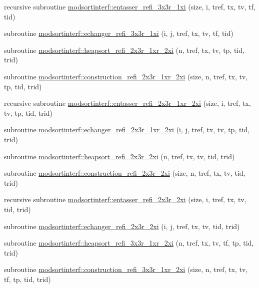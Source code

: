 \begin{DoxyCompactItemize}
\item 
recursive subroutine \hyperlink{namespacemodsortinterf_aab48af578f5c010d365e32ceb20016e0}{modsortinterf\+::entasser\+\_\+refi\+\_\+3x3r\+\_\+1xi} (size, i, tref, tx, tv, tf, tid)
\item 
subroutine \hyperlink{namespacemodsortinterf_a1a9f478c81adb385c800d2db67b4db17}{modsortinterf\+::echanger\+\_\+refi\+\_\+3x3r\+\_\+1xi} (i, j, tref, tx, tv, tf, tid)
\item 
subroutine \hyperlink{namespacemodsortinterf_a662bed8ed392d0d204cc36d1e48fce5b}{modsortinterf\+::heapsort\+\_\+refi\+\_\+2x3r\+\_\+1xr\+\_\+2xi} (n, tref, tx, tv, tp, tid, trid)
\item 
subroutine \hyperlink{namespacemodsortinterf_a0f142d1542ca18e784179367feaa2da8}{modsortinterf\+::construction\+\_\+refi\+\_\+2x3r\+\_\+1xr\+\_\+2xi} (size, n, tref, tx, tv, tp, tid, trid)
\item 
recursive subroutine \hyperlink{namespacemodsortinterf_add447bee1dc15569b2978988dd7f49f8}{modsortinterf\+::entasser\+\_\+refi\+\_\+2x3r\+\_\+1xr\+\_\+2xi} (size, i, tref, tx, tv, tp, tid, trid)
\item 
subroutine \hyperlink{namespacemodsortinterf_a8d80b3f18a439642b1f44e9cc0b624dd}{modsortinterf\+::echanger\+\_\+refi\+\_\+2x3r\+\_\+1xr\+\_\+2xi} (i, j, tref, tx, tv, tp, tid, trid)
\item 
subroutine \hyperlink{namespacemodsortinterf_af0070ac4a4a32d7b75892c431a266ce5}{modsortinterf\+::heapsort\+\_\+refi\+\_\+2x3r\+\_\+2xi} (n, tref, tx, tv, tid, trid)
\item 
subroutine \hyperlink{namespacemodsortinterf_a36e0afef1ddbaec6e02812e1e6cf412f}{modsortinterf\+::construction\+\_\+refi\+\_\+2x3r\+\_\+2xi} (size, n, tref, tx, tv, tid, trid)
\item 
recursive subroutine \hyperlink{namespacemodsortinterf_a4c07f7c23233d32c941f288e1863160e}{modsortinterf\+::entasser\+\_\+refi\+\_\+2x3r\+\_\+2xi} (size, i, tref, tx, tv, tid, trid)
\item 
subroutine \hyperlink{namespacemodsortinterf_a40aaabf1d55c89e6eadd1326df9395e5}{modsortinterf\+::echanger\+\_\+refi\+\_\+2x3r\+\_\+2xi} (i, j, tref, tx, tv, tid, trid)
\item 
subroutine \hyperlink{namespacemodsortinterf_a3d2a0468246523fb3fc1a3b52551e1b5}{modsortinterf\+::heapsort\+\_\+refi\+\_\+3x3r\+\_\+1xr\+\_\+2xi} (n, tref, tx, tv, tf, tp, tid, trid)
\item 
subroutine \hyperlink{namespacemodsortinterf_a8a63b4674b7d0bad760142680729439c}{modsortinterf\+::construction\+\_\+refi\+\_\+3x3r\+\_\+1xr\+\_\+2xi} (size, n, tref, tx, tv, tf, tp, tid, trid)

\end{DoxyCompactItemize}
